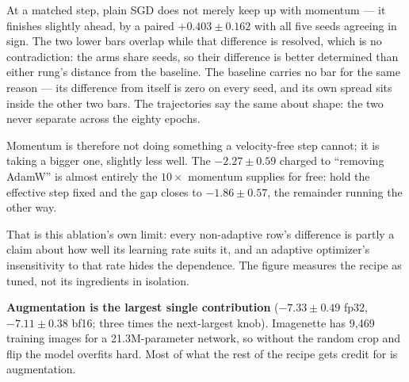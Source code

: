 \begin{center}
\end{center}

\noindent At a matched step, plain SGD does not merely keep up with momentum ---
it finishes slightly ahead, by a paired $+0.403 \pm 0.162$ with all five seeds
agreeing in sign. The two lower bars overlap while that difference is resolved,
which is no contradiction: the arms share seeds, so their difference is better
determined than either rung's distance from the baseline. The baseline carries no
bar for the same reason --- its difference from itself is zero on every seed, and
its own spread sits inside the other two bars. The trajectories say the same
about shape: the two never separate across the eighty epochs.

\medskip\noindent Momentum is therefore not doing something a velocity-free step
cannot; it is taking a bigger one, slightly less well. The $-2.27 \pm 0.59$
charged to ``removing AdamW'' is almost entirely the $10\times$ momentum supplies
for free: hold the effective step fixed and the gap closes to $-1.86 \pm 0.57$,
the remainder running the other way.

\medskip\noindent That is this ablation's own limit: every non-adaptive row's
difference is partly a claim about how well its learning rate suits it, and an
adaptive optimizer's insensitivity to that rate hides the dependence. The figure
measures the recipe as tuned, not its ingredients in isolation.

\medskip\noindent \textbf{Augmentation is the largest single contribution}
($-7.33 \pm 0.49$ fp32, $-7.11 \pm 0.38$ bf16; three times the next-largest
knob). Imagenette has 9{,}469 training images for a 21.3M-parameter network, so
without the random crop and flip the model overfits hard. Most of what the rest
of the recipe gets credit for is augmentation.

